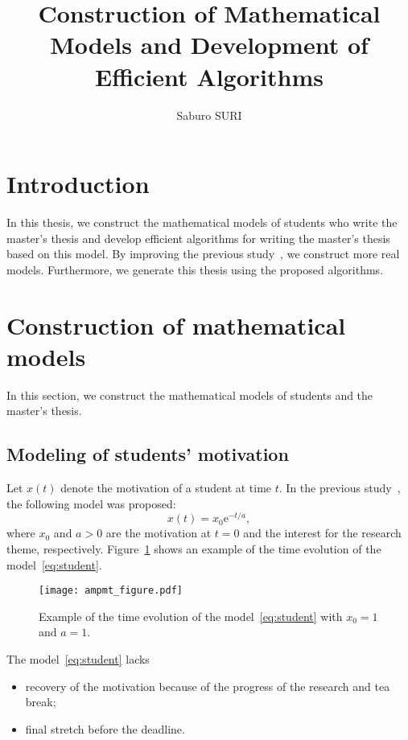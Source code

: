 \documentclass[english]{ampmt}             %
\title[Construction of Mathematical Models\\
    and Development of Efficient Algorithms]
      {Construction of Mathematical Models and Development of
        Efficient Algorithms}
\author{Saburo SURI}
\newcommand{\rme}{\mathrm{e}}
\begin{document}
\ifoutputbody
\makeinsidecover                %
\makeabstract                   %
\maketoc                        %
\setcounter{page}{1}
\section{Introduction}
In this thesis, we construct the mathematical models of students who write
the master's thesis and develop efficient algorithms for writing the master's
thesis based on this model.
By improving the previous study~\cite{suuri2010}, we construct more real models.
Furthermore, we generate this thesis using the proposed algorithms.

\section{Construction of mathematical models}
In this section, we construct the mathematical models of students and
the master's thesis.

\subsection{Modeling of students' motivation}
Let $x(t)$ denote the motivation of a student at time $t$.
In the previous study~\cite{suuri2010}, the following model was proposed:
\begin{equation}\label{eq:student}
  x(t)=x_0 \rme^{-t/a},
\end{equation}
where $x_0$ and $a>0$ are the motivation at $t=0$ and the interest for
the research theme, respectively.
Figure~\ref{fig:student} shows an example of the time evolution of
the model~\eqref{eq:student}.
\begin{figure}[htbp]
  \centering
  \texttt{[image: ampmt\_figure.pdf]}
  \caption{Example of the time evolution of the model~\eqref{eq:student} with
    $x_0=1$ and $a=1$.}
  \label{fig:student}
\end{figure}

The model~\eqref{eq:student} lacks
\begin{itemize}
\item recovery of the motivation because of the progress of the research
  and tea break;
\item final stretch before the deadline.
\end{itemize}
\end{document}
